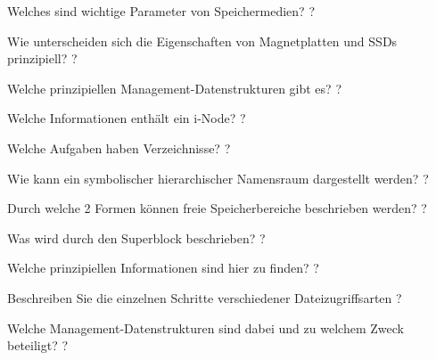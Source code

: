 \documentclass[avery5371]{flashcards}
\begin{document}
\begin{flashcard}[Dateisysteme]{Welches sind wichtige Parameter von Speichermedien?}
    ?
\end{flashcard}

\begin{flashcard}[Dateisysteme]{Wie unterscheiden sich die Eigenschaften von Magnetplatten und SSDs prinzipiell?}
    ?
\end{flashcard}

\begin{flashcard}[Dateisysteme]{Welche prinzipiellen Management-Datenstrukturen gibt es?}
    ?
\end{flashcard}

\begin{flashcard}[Dateisysteme]{Welche Informationen enthält ein i-Node?}
    ?
\end{flashcard}

\begin{flashcard}[Dateisysteme]{Welche Aufgaben haben Verzeichnisse?}
    ?
\end{flashcard}

\begin{flashcard}[Dateisysteme]{Wie kann ein symbolischer hierarchischer Namensraum dargestellt werden?}
    ?
\end{flashcard}

\begin{flashcard}[Dateisysteme]{Durch welche 2 Formen können freie Speicherbereiche beschrieben werden?}
    ?
\end{flashcard}

\begin{flashcard}[Dateisysteme]{Was wird durch den Superblock beschrieben?}
    ?
\end{flashcard}

\begin{flashcard}[Dateisysteme]{Welche prinzipiellen Informationen sind hier zu finden?}
    ?
\end{flashcard}

\begin{flashcard}[Dateisysteme]{Beschreiben Sie die einzelnen Schritte verschiedener Dateizugriffsarten}
    ?
\end{flashcard}

\begin{flashcard}[Dateisysteme]{Welche Management-Datenstrukturen sind dabei und zu welchem Zweck beteiligt?}
    ?
\end{flashcard}
\end{document}
